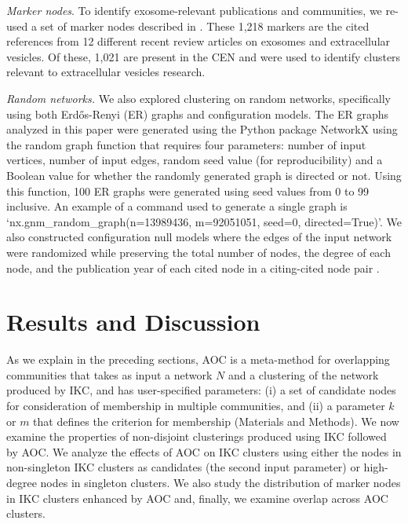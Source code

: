 \documentclass[12pt, oneside]{article}   	%
\begin{document}
\emph{Marker nodes}. To identify exosome-relevant publications and communities, we re-used a set of marker nodes described in  \cite{Wedell2022}. These 1,218 markers are the cited references from 12 different recent review articles on exosomes and extracellular vesicles. Of these, 1,021 are present in the CEN and  were used to identify clusters relevant to extracellular vesicles research.


\emph{Random networks.}
We also explored clustering on random networks, specifically using both Erd\H{o}s-Renyi (ER) graphs and configuration models.  The
ER graphs  analyzed in this paper were generated using the Python package NetworkX \citep{hagberg2008} using the random graph function that requires four parameters: number of input vertices, number of input edges, random seed value (for reproducibility) and a Boolean value for whether the randomly generated graph is directed or not. Using this function, 100 ER graphs were generated using seed values from 0 to 99 inclusive. An example of a command used to generate a single graph is  `nx.gnm\_random\_graph(n=13989436, m=92051051, seed=0, directed=True)'. 
We also constructed configuration null models where the edges of the input network were randomized while preserving the total number of nodes, the degree of each node,  and the publication year of each cited node in a citing-cited node pair \citep{bradley2020}. 
 
\section{Results and Discussion}
	
As we explain in the preceding sections, AOC is a meta-method for overlapping communities that takes as input a network $N$ and a clustering of the network produced by IKC,  and has user-specified parameters: (i) a set of candidate nodes for consideration of membership in multiple communities, and (ii) a parameter $k$ or $m$ that defines the criterion for membership (Materials and Methods). We now examine the properties of non-disjoint clusterings produced using IKC followed by AOC. We analyze the effects of AOC on IKC clusters using either the nodes in non-singleton IKC clusters as candidates (the second input parameter) or high-degree nodes in singleton clusters. 
We also study the distribution of marker nodes in IKC clusters enhanced by AOC and, finally, we examine overlap across AOC clusters. 
	
\end{document}
